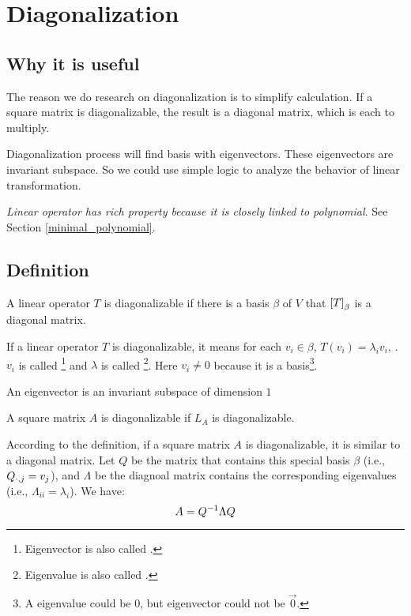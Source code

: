 \chapter{Diagonalization}

\section{Why it is useful}


The reason we do research on diagonalization is to simplify calculation. If a square matrix is diagonalizable, the result is a diagonal matrix, which is each to multiply.

Diagonalization process will find basis with eigenvectors. These eigenvectors are invariant subspace. So we could use simple logic to analyze the behavior of linear transformation.

\emph{Linear operator has rich property because it is closely linked to polynomial}. See Section \ref{minimal_polynomial}.

\section{Definition}

\begin{definition}
    A linear operator $T$ is diagonalizable if there is a basis $\beta$ of $V$ that $\coordinate{T}_\beta$ is a diagonal matrix. 
    
    If a linear operator $T$ is diagonalizable, it means for each $v_i \in \beta$, $T(v_i) = \lambda_i v_i$, . $v_i$ is called \footnote{Eigenvector is also called .} and $\lambda$ is called \footnote{Eigenvalue is also called .}. Here $v_i \neq 0$ because it is a basis\footnote{A eigenvalue could be $0$, but eigenvector could not be $\vec{0}$.}.
    
    An eigenvector is an invariant subspace of dimension $1$
    
    A square matrix $A$ is diagonalizable if $L_A$ is diagonalizable.
\end{definition} 



According to the definition, if a square matrix $A$ is diagonalizable, it is similar to a diagonal matrix. Let $Q$ be the matrix that contains this special basis $\beta$ (i.e., ${Q}_{\cdot, {j}} = v_j$), and $\Lambda$ be the diagnoal matrix contains the corresponding eigenvalues (i.e., $\Lambda_{ii} = \lambda_i$). We have:
\begin{equation}
    A = {Q}^{-1} \Lambda Q
\end{equation}




